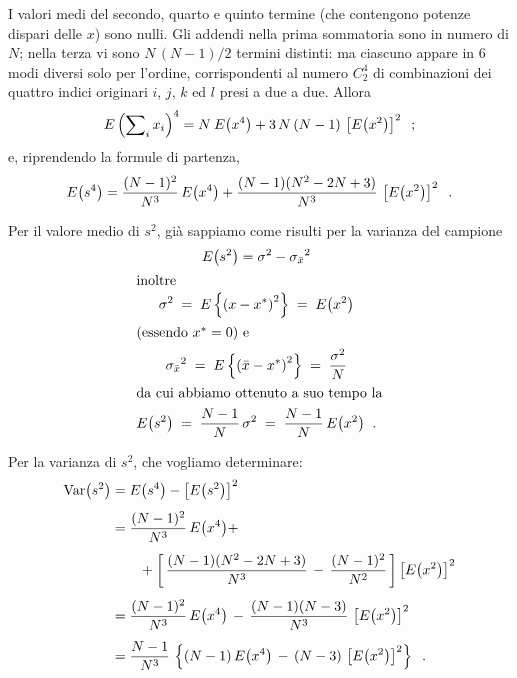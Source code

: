 I valori medi del secondo, quarto e quinto termine (che
contengono potenze dispari delle $x$) sono nulli.  Gli
addendi nella prima sommatoria sono in numero di $N$; nella
terza vi sono $N \, (N-1) / 2$ termini distinti: ma ciascuno
appare in 6 modi diversi solo per l'ordine, corrispondenti
al numero $ C^4_2 $ di combinazioni dei quattro indici
originari $i$, $j$, $k$ ed $l$ presi a due a due.  Allora
\begin{equation*}
  E \left( \sum \nolimits_i x_i \right) ^4 =
    N \: E \bigl( x^4 \bigr) +
    3 \,N \,(N-1) \, \left[ E \bigl( x^2 \bigr)
    \right] ^2 \;\; ;
\end{equation*}
e, riprendendo la formule di partenza,
\begin{equation*}
  E \bigl( s^4 \bigr) =
    \frac{(N-1)^2}{N^3} \, E \bigl( x^4 \bigr) +
    \frac{(N-1)(N^2-2N+3)}{N^3} \,
    \left[ E \bigl( x^2 \bigr) \right] ^2 \;\; .
\end{equation*}

Per il valore medio di $s^2$, gi\`a sappiamo come risulti
per la varianza del campione
\begin{gather*}
  E \bigl( s^2 \bigr) = \sigma^2 -
    {\sigma_{\bar x}}^2 \\
  \intertext{inoltre}
  \sigma^2 \; = \; E \left \{ \left( x - x^*
    \right)^2 \right \} \; = \; E \bigl( x^2 \bigr) \\
  \intertext{(essendo $x^*=0 $) e}
  {\sigma_{\bar x}} ^2 \; = \; E \left \{ \left( \bar x
    - x^* \right) ^2 \right \} \; = \;
    \frac{\sigma^2}{N} \\
  \intertext{da cui abbiamo ottenuto a suo tempo la}
  E \bigl( s^2 \bigr) \; = \;
    \frac{N-1}{N} \, \sigma^2 \; = \;
    \frac{N-1}{N} \, E \bigl( x^2 \bigr) \;\; .
\end{gather*}

Per la varianza di $s^2$, che vogliamo determinare:
\begin{align*}
  \operatorname{Var} \bigl( s^2 \bigr) &= E \bigl( s^4 \bigr) -
    \left[ E \bigl( s^2 \bigr) \right] ^2 \\[1ex]
  &= \frac{(N-1)^2}{N^3} \, E \bigl( x^4 \bigr) +
    \\[1ex]
  &\qquad + \left[ \, \frac{(N-1)(N^2-2N+3)}{N^3}
    \, - \, \frac{(N-1)^2}{N^2} \, \right]
    \left[ E \bigl( x^2 \bigr) \right] ^2 \\[1ex]
  &= \frac{(N-1)^2}{N^3} \, E \bigl( x^4 \bigr)
    \, - \, \frac{(N-1)(N-3)}{N^3} \, \left[ E
    \bigl( x^2 \bigr) \right] ^2 \\[1ex]
  &= \frac{N-1}{N^3} \, \left \{ (N-1) \, E
    \bigl( x^4 \bigr) \, - \, (N-3) \, \left[ E
    \bigl( x^2 \bigr) \right] ^2 \right \} \;\; .
\end{align*}

